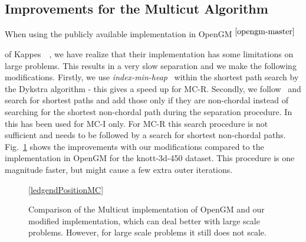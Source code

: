 \documentclass[10pt,twocolumn,letterpaper]{article}
\newcommand{\footref}[1]{%
    $^{\ref{#1}}$%
}
\theoremstyle{definition}
\begin{document}
\subsection{Improvements for the Multicut Algorithm}\label{sec:tunedMC} 
When using the  publicly available implementation in OpenGM\footref{opengm-master}
of Kappes~\etal~\cite{kappes_2013_arxiv}, we have realize that their implementation has some limitations on large problems.
This results in a very slow separation and we make the following modifications.
Firstly, we use \emph{index-min-heap}~\cite{Sedgewick-2011} within the shortest path search by the Dykstra algorithm - this gives a speed up for MC-R.
Secondly, we follow~\cite{kroeger_2012_eccv} and search for shortest paths and add those only if they are non-chordal instead of searching for the shortest non-chordal path
during the separation procedure. 
In~\cite{kroeger_2012_eccv} this has been used for MC-I only. 
For MC-R this search procedure is not sufficient and needs to be followed by a search for shortest non-chordal paths.
%
Fig.~\ref{fig:at:knott-450b} shows the improvements with our modifications compared to the implementation in OpenGM for the knott-3d-450 dataset.
This procedure is one magnitude faster, but might cause a few extra outer iterations.

 \begin{figure}[t]
    \centering
  \begin{center}
  \hypersetup{linkcolor = black}
  \ref{ledgendPositionMC}
  \hypersetup{linkcolor = red}
  \end{center}
    \caption{Comparison of the Multicut implementation of OpenGM and 
    our modified implementation, which can deal better with large scale problems. 
    However, for large scale problems it still does not scale.}
    \label{fig:at:knott-450b}
  \end{figure}
\end{document}
